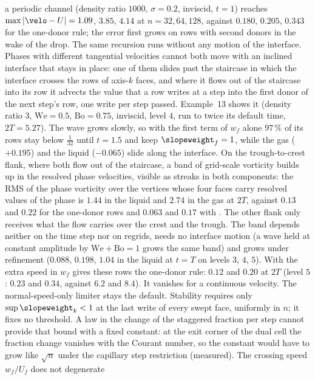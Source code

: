 a periodic channel (density ratio $1000$, $\sigma=0.2$, inviscid, $t=1$)
reaches $\max\abs{\velo-U}=1.09$, $3.85$, $4.14$ at $n=32,64,128$, against
$0.180$, $0.205$, $0.343$ for the one-donor rule; the error first grows on
rows with second donors in the wake of the drop. The same recursion runs
without any motion of the interface. Phases with different tangential
velocities cannot both move with an inclined interface that stays in place:
one of them slides past the staircase in which the interface crosses the rows
of axis-$k$ faces, and where it flows out of the staircase into its row it
advects the value that a row writes at a step into the first donor of the
next step's row, one write per step passed. Example~13 shows it (density
ratio $3$, $\mathrm{We}=0.5$, $\mathrm{Bo}=0.75$, inviscid, level $4$, run to
twice its default time, $2T=5.27$). The wave grows slowly, so with the first
term of $w_f$ alone $97\,\%$ of its rows stay below $\frac1{32}$ until $t=1.5$
and keep $\slopeweight_f=1$, while the gas ($+0.195$) and the liquid
($-0.065$) slide along the interface. On the trough-to-crest flank, where both
flow out of the staircase, a band of grid-scale vorticity builds up in the
resolved phase velocities, visible as streaks in both components: the RMS of
the phase vorticity over the vertices whose four faces carry resolved values
of the phase is $1.44$ in the liquid and $2.74$ in the gas at $2T$, against
$0.13$ and $0.22$ for the one-donor rows and $0.063$ and $0.17$ with
. The other flank only receives what the flow
carries over the crest and the trough. The band depends neither on the time
step nor on regrids, needs no interface motion (a wave held at constant
amplitude by $\mathrm{We}+\mathrm{Bo}=1$ grows the same band) and grows under
refinement ($0.088$, $0.198$, $1.04$ in the liquid at $t=T$ on levels $3$,
$4$, $5$). With  the extra speed in $w_f$ gives these
rows the one-donor rule: $0.12$ and $0.20$ at $2T$ (level $5$: $0.23$ and
$0.34$, against $6.2$ and $8.4$). It vanishes for a continuous velocity.
The normal-speed-only limiter stays the default. Stability requires only
$\sup\slopeweight_k<1$ at the last write of every swept face, uniformly in
$n$; it fixes no threshold. A law in the change of the staggered fraction per
step cannot provide that bound with a fixed constant: at the exit corner of
the dual cell the fraction change vanishes with the Courant number, so the
constant would have to grow like $\sqrt{n}$ under the capillary step
restriction (measured). The crossing speed $w_f/U_f$ does not degenerate
